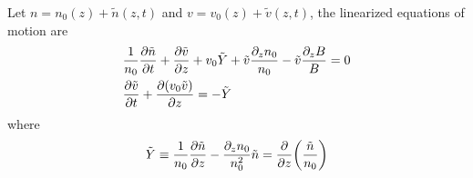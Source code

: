 \begin{proposition}
    Let $n = n_0(z) + \tilde{n}(z,t)$ and $v = v_0(z) + \tilde{v}(z,t)$, the linearized equations of motion are
    \begin{align}
        &\frac{1}{n_0}\pdv{\tilde{n}}{t} 
        + \pdv{\tilde{v}}{z} + v_0\tilde{Y} + \tilde{v}\frac{\partial_z n_0}{n_0} - \tilde{v}\frac{\partial_z B}{B} = 0 
        \label{eq:linearized-conservation-of-mass}
        \\
        &\pdv{\tilde{v}}{t} + \pdv{(v_0\tilde{v})}{z} = -\tilde{Y}
        \label{eq:linearized-conservation-of-momentum}
    \end{align}
    where 
    \[ \tilde{Y} \equiv \frac{1}{n_0}\pdv{\tilde{n}}{z} - \frac{\partial_z n_0}{n_0^2}\tilde{n} = \pdv{z}(\frac{\tilde{n}}{n_0}) \]
\end{proposition}
